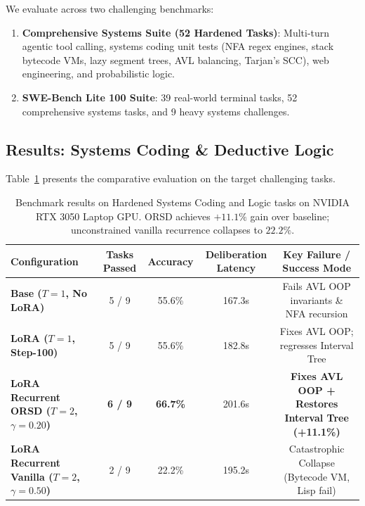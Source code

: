 \documentclass[11pt,a4paper]{article}
\theoremstyle{plain}
\theoremstyle{definition}
\theoremstyle{remark}
\begin{document}
We evaluate across two challenging benchmarks:
\begin{enumerate}
    \item \textbf{Comprehensive Systems Suite (52 Hardened Tasks)}: Multi-turn agentic tool calling, systems coding unit tests (NFA regex engines, stack bytecode VMs, lazy segment trees, AVL balancing, Tarjan's SCC), web engineering, and probabilistic logic.
    \item \textbf{SWE-Bench Lite 100 Suite}: 39 real-world terminal tasks, 52 comprehensive systems tasks, and 9 heavy systems challenges.
\end{enumerate}

\subsection{Results: Systems Coding \& Deductive Logic}
Table~\ref{tab:main_results} presents the comparative evaluation on the target challenging tasks.

\begin{table}[t]
\centering
\small
\begin{tabular}{lcccc}
\toprule
\textbf{Configuration} & \textbf{Tasks Passed} & \textbf{Accuracy} & \textbf{Deliberation Latency} & \textbf{Key Failure / Success Mode} \\
\midrule
\textbf{Base ($T=1$, No LoRA)} & 5 / 9 & 55.6\% & 167.3s & Fails AVL OOP invariants \& NFA recursion \\
\textbf{LoRA ($T=1$, Step-100)} & 5 / 9 & 55.6\% & 182.8s & Fixes AVL OOP; regresses Interval Tree \\
\textbf{LoRA Recurrent ORSD ($T=2$, $\gamma=0.20$)} & \textbf{6 / 9} & \textbf{66.7\%} & 201.6s & \textbf{Fixes AVL OOP + Restores Interval Tree (+11.1\%)} \\
\textbf{LoRA Recurrent Vanilla ($T=2$, $\gamma=0.50$)} & 2 / 9 & 22.2\% & 195.2s & Catastrophic Collapse (Bytecode VM, Lisp fail) \\
\bottomrule
\end{tabular}
\caption{Benchmark results on Hardened Systems Coding and Logic tasks on NVIDIA RTX 3050 Laptop GPU. ORSD achieves $+11.1\%$ gain over baseline; unconstrained vanilla recurrence collapses to $22.2\%$.}
\label{tab:main_results}
\end{table}
\end{document}
